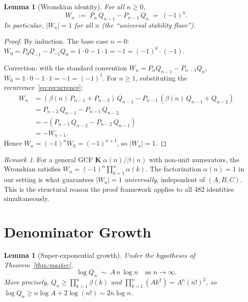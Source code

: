 \documentclass[11pt,a4paper]{article}
\newtheorem{lemma}[theorem]{Lemma}
\theoremstyle{definition}
\theoremstyle{remark}
\newtheorem{remark}[theorem]{Remark}
\begin{document}
\begin{lemma}[Wronskian identity]\label{lem:wronskian}
For all $n \ge 0$,
\begin{equation}\label{eq:wronskian}
  W_n \;:=\; P_n\,Q_{n-1} - P_{n-1}\,Q_n \;=\; (-1)^n.
\end{equation}
In particular, $|W_n| = 1$ for all $n$ (the ``universal stability floor'').
\end{lemma}

\begin{proof}
By induction.  The base case $n = 0$:
$W_0 = P_0 Q_{-1} - P_{-1} Q_0 = 1 \cdot 0 - 1 \cdot 1 = -1 = (-1)^0 \cdot (-1)$.

Correction: with the standard convention $W_n = P_n Q_{n-1} - P_{n-1} Q_n$,
$W_0 = 1\cdot 0 - 1\cdot 1 = -1 = (-1)^1$.
For $n \ge 1$, substituting the recurrence~\eqref{eq:recurrence}:
\begin{align*}
  W_n &= (\beta(n)\,P_{n-1} + P_{n-2})\,Q_{n-1}
       - P_{n-1}\,(\beta(n)\,Q_{n-1} + Q_{n-2})\\
      &= P_{n-2}\,Q_{n-1} - P_{n-1}\,Q_{n-2}\\
      &= -(P_{n-1}\,Q_{n-2} - P_{n-2}\,Q_{n-1})\\
      &= -W_{n-1}.
\end{align*}
Hence $W_n = (-1)^n W_0 = (-1)^{n+1}$, so $|W_n| = 1$.
\end{proof}

\begin{remark}
For a general GCF $\mathbf{K}\;\alpha(n)/\beta(n)$ with non-unit
numerators, the Wronskian satisfies
$W_n = (-1)^n \prod_{k=1}^{n} \alpha(k)$.
The factorization $\alpha(n) = 1$ in our setting is what guarantees
$|W_n| = 1$ \emph{universally}, independent of $(A,B,C)$.
This is the structural reason the proof framework applies to all 482
identities simultaneously.
\end{remark}


\section{Denominator Growth}\label{sec:growth}

\begin{lemma}[Super-exponential growth]\label{lem:growth}
Under the hypotheses of Theorem~\ref{thm:master},
\begin{equation}\label{eq:growth}
  \log Q_n \;\sim\; A\,n\,\log n \quad\text{as } n \to \infty.
\end{equation}
More precisely, $Q_n \ge \prod_{k=1}^{n} \beta(k)$ and
$\prod_{k=1}^{n}(Ak^2) = A^n (n!)^2$, so
$\log Q_n \ge n\log A + 2\log(n!) \sim 2n\log n$.
\end{lemma}
\end{document}
